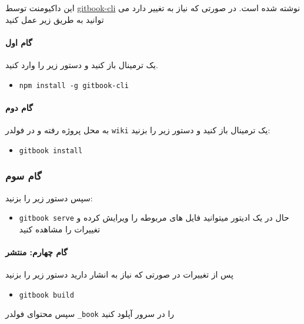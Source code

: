 \documentclass[]{article}
\providecommand{\tightlist}{%
  \setlength{\itemsep}{0pt}\setlength{\parskip}{0pt}}
\let\oldparagraph\paragraph
\renewcommand{\paragraph}[1]{\oldparagraph{#1}\mbox{}}
\begin{document}
این داکیومنت توسط
\href{https://github.com/GitbookIO/gitbook-cli}{gitbook-cli} نوشته شده
است. در صورتی که نیاز به تغییر دارد می توانید به طریق زیر عمل کنید

\paragraph{گام اول}\label{ux6afux627ux645-ux627ux648ux644-1}

یک ترمینال باز کنید و دستور زیر را وارد کنید.

\begin{itemize}
\tightlist
\item
  \texttt{npm\ install\ -g\ gitbook-cli}
\end{itemize}

\paragraph{گام دوم}\label{ux6afux627ux645-ux62fux648ux645-1}

به محل پروژه رفته و در فولدر \texttt{wiki} یک ترمینال باز کنید و دستور
زیر را بزنید:

\begin{itemize}
\tightlist
\item
  \texttt{gitbook\ install}
\end{itemize}

\subsubsection{گام سوم}\label{ux6afux627ux645-ux633ux648ux645-1}

سپس دستور زیر را بزنید:

\begin{itemize}
\tightlist
\item
  \texttt{gitbook\ serve} حال در یک ادیتور میتوانید فایل های مربوطه را
  ویرایش کرده و تغییرات را مشاهده کنید
\end{itemize}

\paragraph{گام چهارم:
منتشر}\label{ux6afux627ux645-ux686ux647ux627ux631ux645-ux645ux646ux62aux634ux631}

پس از تغییرات در صورتی که نیاز به انشار دارید دستور زیر را بزنید

\begin{itemize}
\tightlist
\item
  \texttt{gitbook\ build}
\end{itemize}

سپس محتوای فولدر \texttt{\_book} را در سرور آپلود کنید
\end{document}
